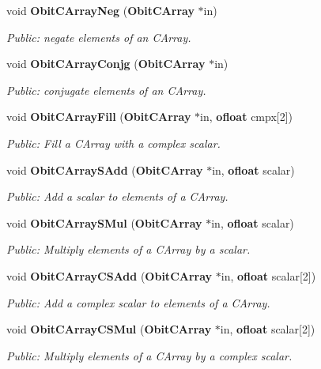 \begin{CompactItemize}
void {\bf Obit\-CArray\-Neg} ({\bf Obit\-CArray} $\ast$in)
\begin{CompactList}\small\item\em Public: negate elements of an CArray. \item\end{CompactList}\item 
void {\bf Obit\-CArray\-Conjg} ({\bf Obit\-CArray} $\ast$in)
\begin{CompactList}\small\item\em Public: conjugate elements of an CArray. \item\end{CompactList}\item 
void {\bf Obit\-CArray\-Fill} ({\bf Obit\-CArray} $\ast$in, {\bf ofloat} cmpx[2])
\begin{CompactList}\small\item\em Public: Fill a CArray with a complex scalar. \item\end{CompactList}\item 
void {\bf Obit\-CArray\-SAdd} ({\bf Obit\-CArray} $\ast$in, {\bf ofloat} scalar)
\begin{CompactList}\small\item\em Public: Add a scalar to elements of a CArray. \item\end{CompactList}\item 
void {\bf Obit\-CArray\-SMul} ({\bf Obit\-CArray} $\ast$in, {\bf ofloat} scalar)
\begin{CompactList}\small\item\em Public: Multiply elements of a CArray by a scalar. \item\end{CompactList}\item 
void {\bf Obit\-CArray\-CSAdd} ({\bf Obit\-CArray} $\ast$in, {\bf ofloat} scalar[2])
\begin{CompactList}\small\item\em Public: Add a complex scalar to elements of a CArray. \item\end{CompactList}\item 
void {\bf Obit\-CArray\-CSMul} ({\bf Obit\-CArray} $\ast$in, {\bf ofloat} scalar[2])
\begin{CompactList}\small\item\em Public: Multiply elements of a CArray by a complex scalar. \item\end{CompactList}\item 

\end{CompactItemize}
